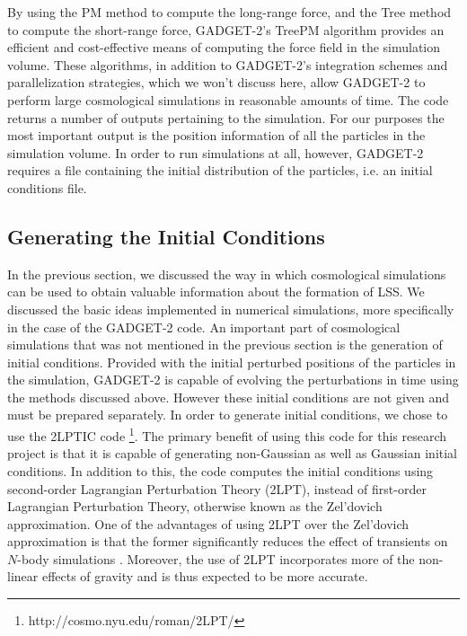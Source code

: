 \documentclass[10pt,letterpaper,final]{iopart}
\numberwithin{equation}{subsection}
\begin{document}
By using the PM method to compute the long-range force, and the Tree method to compute the short-range force, GADGET-2's TreePM algorithm provides an efficient and cost-effective means of computing the force field in the simulation volume. These algorithms, in addition to GADGET-2's integration schemes and parallelization strategies, which we won't discuss here, allow GADGET-2 to perform large cosmological simulations in reasonable amounts of time. The code returns a number of outputs pertaining to the simulation. For our purposes the most important output is the position information of all the particles in the simulation volume. In order to run simulations at all, however, GADGET-2 requires a file containing the initial distribution of the particles, i.e. an initial conditions file.  


%

\subsection{Generating the Initial Conditions}\label{sec:2lpt}

In the previous section, we discussed the way in which cosmological simulations can be used to obtain valuable information about the formation of LSS. We discussed the basic ideas implemented in numerical simulations, more specifically in the case of the GADGET-2 code. An important part of cosmological simulations that was not mentioned in the previous section is the generation of initial conditions. Provided with the initial perturbed positions of the particles in the simulation, GADGET-2 is capable of evolving the perturbations in time using the methods discussed above. However these initial conditions are not given and must be prepared separately. In order to generate initial conditions, we chose to use the 2LPTIC code \footnote{http://cosmo.nyu.edu/roman/2LPT/}. The primary benefit of using this code for this research project is that it is capable of generating non-Gaussian as well as Gaussian initial conditions. In addition to this, the code computes the initial conditions using second-order Lagrangian Perturbation Theory (2LPT), instead of first-order Lagrangian Perturbation Theory, otherwise known as the Zel'dovich approximation. One of the advantages of using 2LPT over the Zel'dovich approximation is that the former significantly reduces the effect of transients on $N$-body simulations \cite{2lpt}\cite{Transients1}\cite{Transients2}. Moreover, the use of 2LPT incorporates more of the non-linear effects of gravity and is thus expected to be more accurate. 
\end{document}

